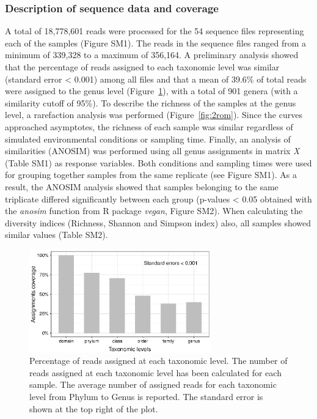 \subsubsection{Description of sequence data and coverage}
A total of 18,778,601 reads were processed for the 54 sequence files representing each of the samples (Figure SM1). The reads in the sequence files ranged from a minimum of 339,328 to a maximum of 356,164. A preliminary analysis showed that the percentage of reads assigned to each taxonomic level was similar (standard error {\textless} 0.001) among all files and that a mean of 39.6\% of total reads were assigned to the genus level (Figure~\ref{fig:1rom}), with a total of 901 genera (with a similarity cutoff of 95\%). To describe the richness of the samples at the genus level, a rarefaction analysis was performed (Figure~\ref{fig:2rom}). Since the curves approached asymptotes,  the richness of each sample was similar regardless of simulated environmental conditions or sampling time. Finally, an analysis of similarities (ANOSIM) was performed using all genus assignments in matrix \textit{X} (Table SM1) as response variables. Both conditions and sampling times were used for grouping together samples from the same replicate (see Figure SM1). As a result, the ANOSIM analysis showed that samples belonging to the same triplicate differed significantly between each group (p-values {\textless} 0.05 obtained with the \textit{anosim} function from R package \textit{vegan}, Figure SM2). When calculating the diversity indices (Richness, Shannon and Simpson index) also, all samples showed similar values (Table SM2).\\
\begin{figure}[!tb]
	\centering
	\includegraphics[width=0.7\textwidth]{./figures/Chapter_3/Fig1.eps}
  	\caption{Percentage of reads assigned at each taxonomic level. The number of reads assigned at each taxonomic level has been calculated for each sample. The average number of assigned reads for each taxonomic level from Phylum to Genus is reported. The standard error is shown at the top right of the plot. \label{fig:1rom}}
\end{figure}

